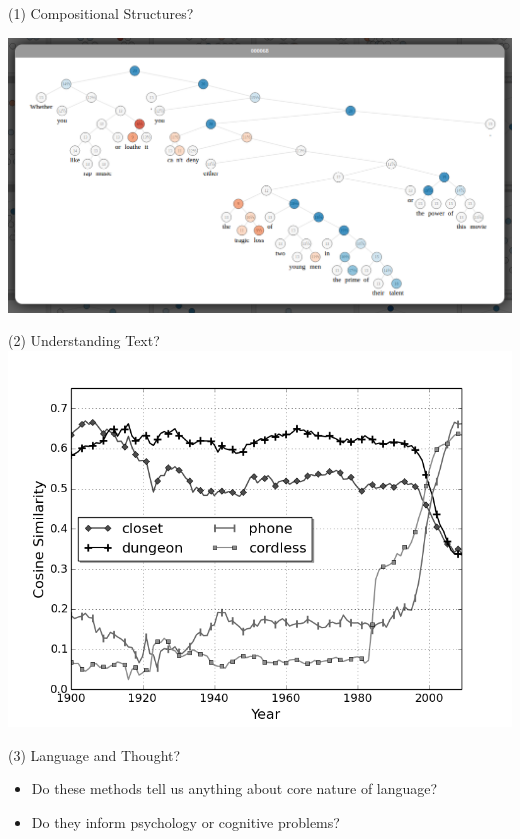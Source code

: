 \documentclass{beamer}
\begin{document}
\begin{frame}{(1) Compositional Structures?}
  \begin{center}
    \includegraphics[width=\textwidth]{sentiment}
  \end{center}
\end{frame}

\begin{frame}{(2) Understanding Text?}
  \includegraphics[width=\textwidth]{cell}
\end{frame}


\begin{frame}{(3) Language and Thought?}
  \begin{itemize}
  \item Do these methods tell us anything about core nature of language?
    \air 

  \item Do they inform psychology or cognitive problems?
  \end{itemize}
\end{frame}
\end{document}
